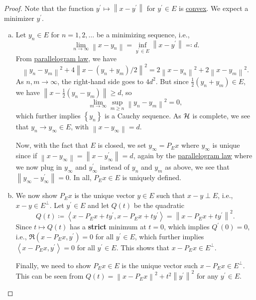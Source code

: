 \begin{proof}
	Note that the function \(y^\prime \mapsto \left\lVert x - y^\prime \right\rVert \) for \(y^\prime \in E\) is \hyperref[def:convex-function]{convex}. We expect a minimizer \(y^\prime \).
	\begin{enumerate}[(a)]
		\item Let \(y_n\in E\) for \(n = 1, 2, \ldots  \) be a minimizing sequence, i.e.,
		      \[
			      \lim\limits_{n \to \infty} \left\lVert x - y_n\right\rVert = \inf _{y^\prime \in E}\left\lVert x - y^\prime \right\rVert \eqqcolon d.
		      \]
		      From \hyperref[lma:parallelogram-law]{parallelogram law}, we have
		      \[
			      \left\lVert y_{n} - y_{m} \right\rVert^{2} + 4 \left\lVert x - (y_{n} + y_{m} ) / 2\right\rVert ^{2} = 2\left\lVert x - y_{n} \right\rVert ^{2} + 2\left\lVert x- y_{m} \right\rVert ^{2}.
		      \]
		      As \(n, m\to \infty \), the right-hand side goes to \(4d^{2} \). But since \(\frac{1}{2}(y_{n} + y_{m} )\in E\), we have \(\left\lVert x - \frac{1}{2}(y_{n} - y_{m} )\right\rVert \geq d\), so
		      \[
			      \lim\limits_{m \to \infty} \sup _{m \geq n}\left\lVert y_{n} - y_{m} \right\rVert^{2} = 0,
		      \]
		      which further implies \(\left\{ y_{n}  \right\} \) is a Cauchy sequence. As \(\mathcal{\MakeUppercase{h}} \) is complete, we see that \(y_{n} \to y_{\infty }\in E\), with \(\left\lVert x - y_{\infty }\right\rVert=d \).

		      Now, with the fact that \(E\) is closed, we set \(y_\infty = P_E x\) where \(y_\infty \) is unique since if \(\left\lVert x - y_\infty \right\rVert = \left\lVert x - y^\prime _\infty \right\rVert = d \), again by the \hyperref[lma:parallelogram-law]{parallelogram law} where we now plug in \(y_\infty \) and \(y_\infty ^\prime \) instead of \(y_{n} \) and \(y_{m} \) as above, we see that \(\left\lVert y_\infty - y^\prime _\infty \right\rVert = 0\). In all, \(P_E x \in E\) is uniquely defined.

		\item We now show \(P_E x\) is the unique vector \(y\in E\) such that \(x - y\perp E\), i.e., \(x-y\in E^\perp\). Let \(y^\prime \in E\) and let \(Q(t)\) be the quadratic
		      \[
			      Q(t)\coloneqq \left\langle x-P_E x + ty^\prime , x - P_E x + ty^\prime  \right\rangle = \left\lVert x - P_E x + ty^\prime \right\rVert ^{2}.
		      \]
		      Since \(t\mapsto Q(t)\) has a \textbf{strict} minimum at \(t = 0\), which implies \(Q^\prime (0) = 0\), i.e., \(\Re \left( x-P_E x, y^\prime  \right) = 0\) for all \(y^\prime \in E\), which further implies \(\left\langle x-P_E x, y^\prime  \right\rangle= 0\) for all \(y^\prime \in E\). This shows that \(x - P_E x\in E^{\perp}\).

		      Finally, we need to show \(P_E x\in E\) is the unique vector such \(x - P_E x\in E^\perp\). This can be seen from \(Q(t)=\left\lVert x - P_E x\right\rVert^{2} + t^{2} \left\lVert y^\prime \right\rVert^{2}\) for any \(y^\prime \in E\).
	\end{enumerate}
\end{proof}

